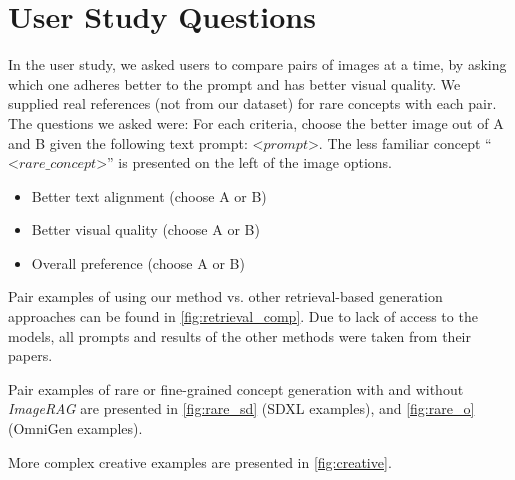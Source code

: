 \section{User Study Questions}
\label{app:user_study}

In the user study, we asked users to compare pairs of images at a time, by asking which one adheres better to the prompt and has better visual quality. We supplied real references (not from our dataset) for rare concepts with each pair.
The questions we asked were:
For each criteria, choose the better image out of A and B given the following text prompt:
$\mathord{<}prompt\mathord{>}$.
The less familiar concept ``$\mathord{<}rare\_concept\mathord{>}$'' is presented on the left of the image options.
\begin{itemize}
    \item Better text alignment (choose A or B)
    \item Better visual quality (choose A or B)
    \item Overall preference (choose A or B)
\end{itemize} 

Pair examples of using our method vs. other retrieval-based generation approaches can be found in \cref{fig:retrieval_comp}. 
Due to lack of access to the models, all prompts and results of the other methods were taken from their papers.




Pair examples of rare or fine-grained concept generation with and without \emph{ImageRAG} are presented in \cref{fig:rare_sd} (SDXL examples), and \cref{fig:rare_o} (OmniGen examples).


More complex creative examples are presented in \cref{fig:creative}.

